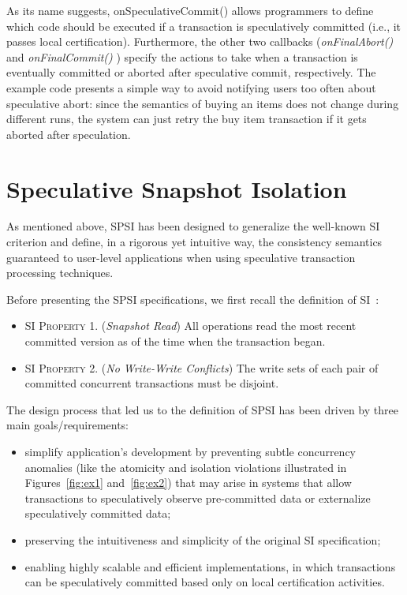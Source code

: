 As its name suggests, onSpeculativeCommit() allows programmers to define which code should be executed if a transaction is speculatively committed (i.e., it passes local certification). Furthermore, the other two callbacks (\textit{onFinalAbort()} and \textit{onFinalCommit()} ) specify the actions to take when a transaction is eventually committed or aborted after speculative commit, respectively. The example code presents a simple way to avoid notifying users too often about speculative abort: since the semantics of buying an items does not change during different runs, the system can just retry the buy item transaction if it gets aborted after speculation.

\section{Speculative Snapshot Isolation}
\label{subsec:ssi}
As mentioned above, SPSI has been designed to generalize the well-known SI criterion and define, in a rigorous yet intuitive way, the consistency semantics guaranteed to user-level applications when using speculative transaction processing techniques.

Before presenting the SPSI specifications, we first recall the definition of SI~\cite{weikum2001transactional}:

\begin{itemize}
\item \textsc{SI Property 1.} (\textit{Snapshot Read}) All operations read the most
recent committed version as of the time when the transaction began.
\item \textsc{SI Property 2.} (\textit{No Write-Write Conflicts}) The write sets of
each pair of committed concurrent transactions must be disjoint.
\end{itemize}

The design process that led us to the definition of SPSI has been driven by three main goals/requirements:
\begin{itemize}
\item simplify application's development by preventing subtle concurrency anomalies (like the atomicity and isolation violations illustrated in Figures~\ref{fig:ex1} and~\ref{fig:ex2}) that may arise in systems that allow transactions to speculatively observe pre-committed data or externalize speculatively committed data;
\item preserving the intuitiveness and simplicity of the original SI specification;
\item enabling highly scalable and efficient implementations, in which transactions can be speculatively committed based only on local certification activities.
\end{itemize}


